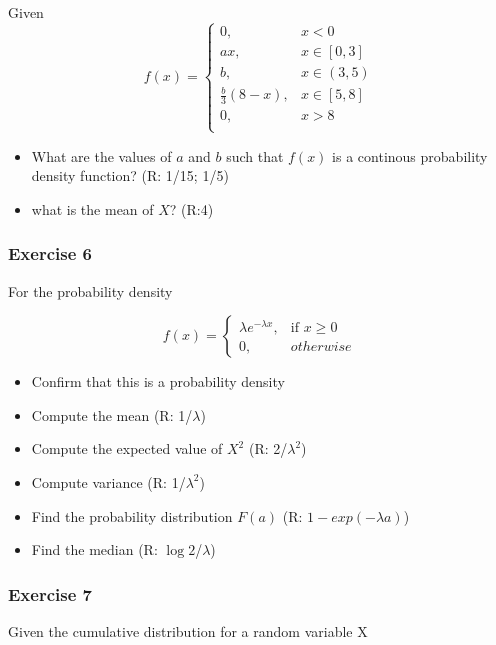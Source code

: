\documentclass[
]{book}
\providecommand{\tightlist}{%
  \setlength{\itemsep}{0pt}\setlength{\parskip}{0pt}}
\begin{document}
Given
\[
    f(x)= 
\begin{cases}
0, & x < 0 \\
ax, & x \in [0,3] \\
b, & x \in (3,5) \\
\frac{b}{3}(8-x),& x \in [5,8]\\
0, & x > 8 \\
\end{cases}
\]

\begin{itemize}
\item
  What are the values of \(a\) and \(b\) such that \(f(x)\) is a continous probability density function? (R: 1/15; 1/5)
\item
  what is the mean of \(X\)? (R:4)
\end{itemize}

\hypertarget{exercise-6}{%
\subsubsection{Exercise 6}\label{exercise-6}}

For the probability density

\[
    f(x)= 
\begin{cases}
    \lambda e^{-\lambda x},& \text{if } x \geq 0\\
    0,& otherwise 
\end{cases}
\]

\begin{itemize}
\tightlist
\item
  Confirm that this is a probability density
\item
  Compute the mean (R: 1/\(\lambda\))
\item
  Compute the expected value of \(X^2\) (R: 2/\(\lambda^2\))
\item
  Compute variance (R: 1/\(\lambda^2\))
\item
  Find the probability distribution \(F(a)\) (R: \(1-exp(-\lambda a)\))
\item
  Find the median (R: \(\log{2}\)/\(\lambda\))
\end{itemize}

\hypertarget{exercise-7}{%
\subsubsection{Exercise 7}\label{exercise-7}}

Given the cumulative distribution for a random variable X
\end{document}
